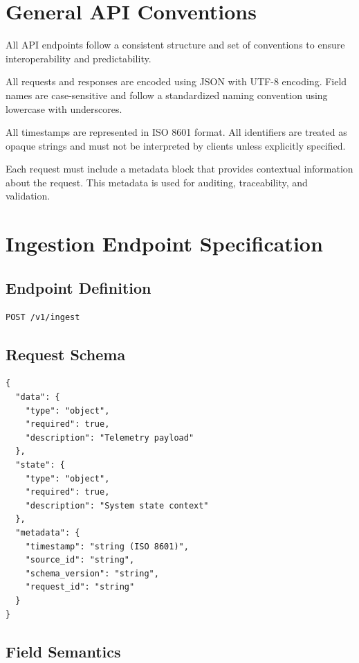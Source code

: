 \section{General API Conventions}

All API endpoints follow a consistent structure and set of conventions to ensure interoperability and predictability.

All requests and responses are encoded using JSON with UTF-8 encoding. Field names are case-sensitive and follow a standardized naming convention using lowercase with underscores.

All timestamps are represented in ISO 8601 format. All identifiers are treated as opaque strings and must not be interpreted by clients unless explicitly specified.

Each request must include a metadata block that provides contextual information about the request. This metadata is used for auditing, traceability, and validation.

\section{Ingestion Endpoint Specification}

\subsection{Endpoint Definition}

\begin{verbatim}
POST /v1/ingest
\end{verbatim}

\subsection{Request Schema}

\begin{verbatim}
{
  "data": {
    "type": "object",
    "required": true,
    "description": "Telemetry payload"
  },
  "state": {
    "type": "object",
    "required": true,
    "description": "System state context"
  },
  "metadata": {
    "timestamp": "string (ISO 8601)",
    "source_id": "string",
    "schema_version": "string",
    "request_id": "string"
  }
}
\end{verbatim}

\subsection{Field Semantics}

